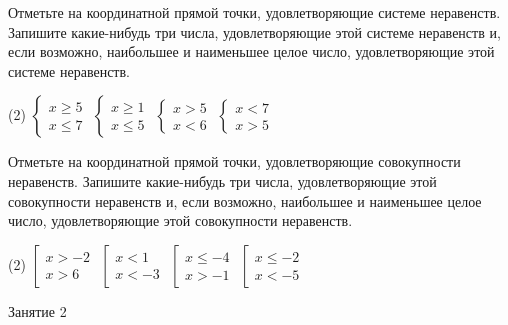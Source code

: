 \begin{class}[number=1]
\begin{listofex}
		\item Отметьте на координатной прямой точки, удовлетворяющие системе неравенств. Запишите какие-нибудь три числа, удовлетворяющие этой системе неравенств и, если возможно, наибольшее и наименьшее целое число, удовлетворяющие этой системе неравенств.
		\begin{tasks}(2)
			\task \( \begin{cases} x \ge 5 \\ x \le 7 \end{cases} \)
			\task \( \begin{cases} x \ge 1 \\ x \le 5 \end{cases} \)
			\task \( \begin{cases} x>5 \\ x<6 \end{cases} \)
			\task \( \begin{cases} x<7 \\ x>5 \end{cases} \)
		\end{tasks}
		\item Отметьте на координатной прямой точки, удовлетворяющие совокупности неравенств. Запишите какие-нибудь три числа, удовлетворяющие этой совокупности неравенств и, если возможно, наибольшее и наименьшее целое число, удовлетворяющие этой совокупности неравенств.
		\begin{tasks}(2)
			\task \( \left[ 
			\begin{array}{l}
				x>-2\\
				x>6
			\end{array}
			\right. \)
			\task \( \left[
			\begin{array}{l} x<1 \\ x<-3 \end{array} \right. \)
			\task \( \left[
			\begin{array}{l} x \le -4 \\ x>-1 \end{array} \right. \)
			\task \( \left[
			\begin{array}{l} x \le -2 \\ x < -5 \end{array} \right. \)
		\end{tasks}
		
	\end{listofex}
\end{class}
\begin{class}[number=2]
	\begin{listofex}
		\item Занятие 2
	\end{listofex}
\end{class}

